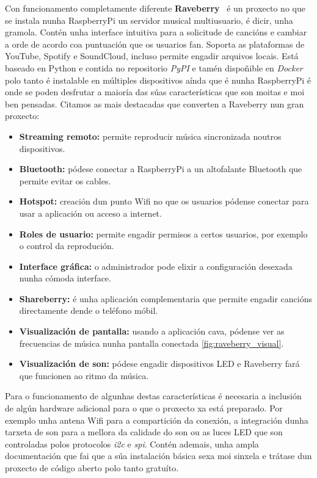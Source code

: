 Con funcionamento completamente diferente \textbf{Raveberry}~\cite{raveberry} é un proxecto no que se instala nunha RaspberryPi un servidor musical multiusuario, é dicir, unha gramola. Contén unha interface intuitiva para a solicitude de cancións e cambiar a orde de acordo coa puntuación que os usuarios fan. Soporta as plataformas de YouTube, Spotify e SoundCloud, incluso permite engadir arquivos locais. Está baseado en Python e contida no repositorio \textit{PyPI} e tamén dispoñible en \textit{Docker} polo tanto é instalable en múltiples dispositivos aínda que é nunha RaspberryPi é onde se poden desfrutar a maioría das súas características que son moitas e moi ben pensadas. Citamos as mais destacadas que converten a Raveberry nun gran proxecto:
\begin{itemize}
	\item \textbf{Streaming remoto:} permite reproducir música sincronizada noutros dispositivos.
	\item \textbf{Bluetooth:} pódese conectar a RaspberryPi a un altofalante Bluetooth que permite evitar os cables.
	\item \textbf{Hotspot:} creación dun punto Wifi no que os usuarios pódense conectar para usar a aplicación ou acceso a internet.
	\item \textbf{Roles de usuario:} permite engadir permisos a certos usuarios, por exemplo o control da reprodución.
	\item \textbf{Interface gráfica:} o administrador pode elixir a configuración desexada nunha cómoda interface.
	\item \textbf{Shareberry:} é unha aplicación complementaria que permite engadir cancións directamente dende o teléfono móbil.
	\item \textbf{Visualización de pantalla:} usando a aplicación cava, pódense ver as frecuencias de música nunha pantalla conectada \ref{fig:raveberry_visual}.
	\item \textbf{Visualización de son:} pódese engadir dispositivos LED e Raveberry fará que funcionen ao ritmo da música.
\end{itemize}
Para o funcionamento de algunhas destas características é necesaria a inclusión de algún hardware adicional para o que o proxecto xa está preparado. Por exemplo unha antena Wifi para a compartición da conexión, a integración dunha tarxeta de son para a mellora da calidade do son ou as luces LED que son controladas polos protocolos \textit{i2c} e \textit{spi}. Contén ademais, unha ampla documentación que fai que a súa instalación básica sexa moi sinxela e trátase dun proxecto de código aberto polo tanto gratuíto.

